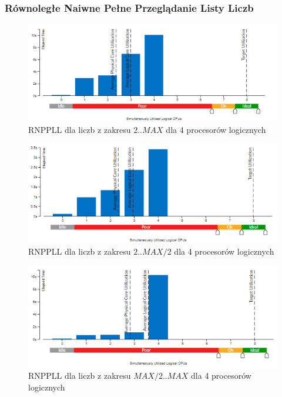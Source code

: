 \documentclass{article}
\begin{document}
            \subsubsection{Równoległe Naiwne Pełne Przeglądanie Listy Liczb}
                \begin{figure}[H]
                    \includegraphics[width=13cm]{rownolegly_domain_bezsita4_2_MAX}
                    \caption{\gls{RNPPLL} dla liczb z zakresu $2 .. MAX$ dla 4 procesorów logicznych}
                \end{figure}
                \begin{figure}[H]
                    \includegraphics[width=13cm]{rownolegly_domain_bezsita4_2_MAX2}
                    \caption{\gls{RNPPLL} dla liczb z zakresu $2 .. MAX / 2$ dla 4 procesorów logicznych}
                \end{figure}
                \begin{figure}[H]
                    \includegraphics[width=13cm]{rownolegly_domain_bezsita4_MAX2_MAX}
                    \caption{\gls{RNPPLL} dla liczb z zakresu $MAX / 2 .. MAX$ dla 4 procesorów logicznych}
                \end{figure}
\end{document}

